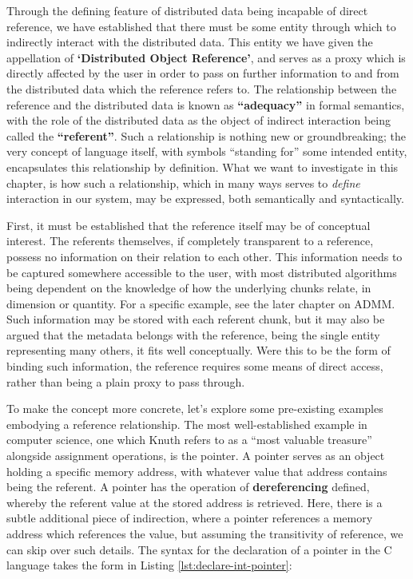 Through the defining feature of distributed data being incapable of
direct reference, we have established that there must be some entity
through which to indirectly interact with the distributed data. This
entity we have given the appellation of \textbf{`Distributed Object
    Reference'}, and serves as a proxy which is directly affected by the
user in order to pass on further information to and from the distributed
data which the reference refers to. The relationship between the
reference and the distributed data is known as \textbf{``adequacy''} in
formal semantics, with the role of the distributed data as the object of
indirect interaction being called the \textbf{``referent''}. Such a
relationship is nothing new or groundbreaking; the very concept of
language itself, with symbols ``standing for'' some intended entity,
encapsulates this relationship by definition. What we want to
investigate in this chapter, is how such a relationship, which in many
ways serves to \emph{define} interaction in our system, may be
expressed, both semantically and syntactically.

First, it must be established that the reference itself may be of
conceptual interest. The referents themselves, if completely transparent
to a reference, possess no information on their relation to each other.
This information needs to be captured somewhere accessible to the user,
with most distributed algorithms being dependent on the knowledge of how
the underlying chunks relate, in dimension or quantity. For a specific
example, see the later chapter on ADMM. Such information may be stored
with each referent chunk, but it may also be argued that the metadata
belongs with the reference, being the single entity representing many
others, it fits well conceptually. Were this to be the form of binding
such information, the reference requires some means of direct access,
rather than being a plain proxy to pass through.

To make the concept more concrete, let's explore some pre-existing
examples embodying a reference relationship. The most well-established
example in computer science, one which Knuth refers to as a ``most
valuable treasure'' alongside assignment operations, is the pointer. A
pointer serves as an object holding a specific memory address, with
whatever value that address contains being the referent. A pointer has
the operation of \textbf{dereferencing} defined, whereby the referent
value at the stored address is retrieved. Here, there is a subtle
additional piece of indirection, where a pointer references a memory
address which references the value, but assuming the transitivity of
reference, we can skip over such details. The syntax for the declaration
of a pointer in the C language takes the form in Listing \ref{lst:declare-int-pointer}:

